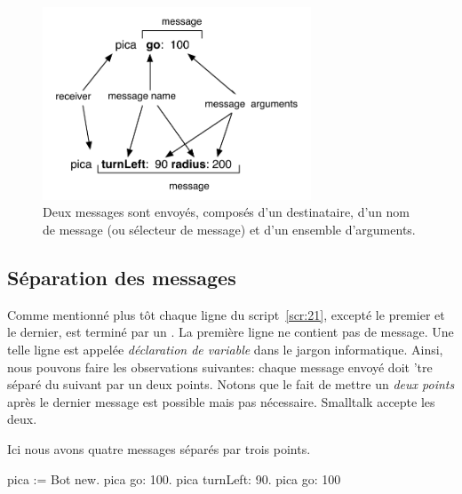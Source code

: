 \documentclass[a4paper,10pt,twoside]{book}
\begin{document}
\begin{figure}[h]
\begin{center}\includegraphics[width=8cm]{5-message}
\caption{Deux messages sont envoy\'es, compos\'es d'un destinataire, d'un nom de message (ou s\'electeur de message) et d'un ensemble d'arguments.\label{fig:firstScriptMessage}}\end{center}
\end{figure}

\subsection{S\'eparation des messages}

Comme mentionn\'e plus t\^ot chaque ligne du script~\ref{scr:21}, except\'e le premier et le dernier, est termin\'e par un \ct{:}. La premi\`ere ligne ne contient pas de message. Une telle ligne est appel\'ee \emph{d\'eclaration de variable} dans le jargon informatique. Ainsi, nous pouvons faire les observations suivantes: chaque message envoy\'e doit 'tre s\'epar\'e du suivant par un deux points. Notons que le fait de mettre un \emph{deux points} apr\`es le dernier message est possible mais pas n\'ecessaire. Smalltalk accepte les deux.


Ici nous avons quatre messages s\'epar\'es par trois points.
\begin{code}{}
	pica := Bot new. 
	pica go: 100. 
	pica turnLeft: 90. 
	pica go: 100 
\end{code}


\end{document}
